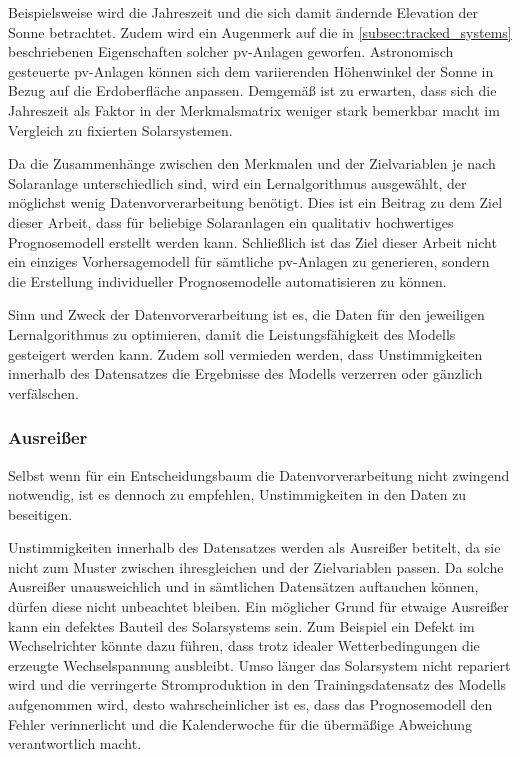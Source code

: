 \documentclass[12pt, a4paper]{article}
\newcommand*{\fullref}[1]{\hyperref[{#1}]{\autoref*{#1} \textit{\nameref*{#1}}}}
\begin{document}
Beispielsweise wird die Jahreszeit und die sich damit ändernde Elevation der Sonne betrachtet. Zudem wird ein Augenmerk auf die in \fullref{subsec:tracked_systems} beschriebenen Eigenschaften solcher \ac{pv}-Anlagen geworfen. Astronomisch gesteuerte \ac{pv}-Anlagen können sich dem variierenden Höhenwinkel der Sonne in Bezug auf die Erdoberfläche anpassen. Demgemäß ist zu erwarten, dass sich die Jahreszeit als Faktor in der Merkmalsmatrix weniger stark bemerkbar macht im Vergleich zu fixierten Solarsystemen. 

Da die Zusammenhänge zwischen den Merkmalen und der Zielvariablen je nach Solaranlage unterschiedlich sind, wird ein Lernalgorithmus ausgewählt, der möglichst wenig Datenvorverarbeitung benötigt. Dies ist ein Beitrag zu dem Ziel dieser Arbeit, dass für beliebige Solaranlagen ein qualitativ hochwertiges Prognosemodell erstellt werden kann. Schließlich ist das Ziel dieser Arbeit nicht ein einziges Vorhersagemodell für sämtliche \ac{pv}-Anlagen zu generieren, sondern die Erstellung individueller Prognosemodelle automatisieren zu können.

Sinn und Zweck der Datenvorverarbeitung ist es, die Daten für den jeweiligen Lernalgorithmus zu optimieren, damit die Leistungsfähigkeit des Modells gesteigert werden kann. Zudem soll vermieden werden, dass Unstimmigkeiten innerhalb des Datensatzes die Ergebnisse des Modells verzerren oder gänzlich verfälschen.

\subsubsection{Ausreißer}
\label{subsubsec:outlier}

Selbst wenn für ein Entscheidungsbaum die Datenvorverarbeitung nicht zwingend notwendig, ist es dennoch zu empfehlen, Unstimmigkeiten in den Daten zu beseitigen.

Unstimmigkeiten innerhalb des Datensatzes werden als Ausreißer betitelt, da sie nicht zum Muster zwischen ihresgleichen und der Zielvariablen passen. Da solche Ausreißer unausweichlich und in sämtlichen Datensätzen auftauchen können, dürfen diese nicht unbeachtet bleiben. Ein möglicher Grund für etwaige Ausreißer kann ein defektes Bauteil des Solarsystems sein. Zum Beispiel ein Defekt im Wechselrichter könnte dazu führen, dass trotz idealer Wetterbedingungen die erzeugte Wechselspannung ausbleibt. Umso länger das Solarsystem nicht repariert wird und die verringerte Stromproduktion in den Trainingsdatensatz des Modells aufgenommen wird, desto wahrscheinlicher ist es, dass das Prognosemodell den Fehler verinnerlicht und die Kalenderwoche für die übermäßige Abweichung verantwortlich macht.
\end{document}
